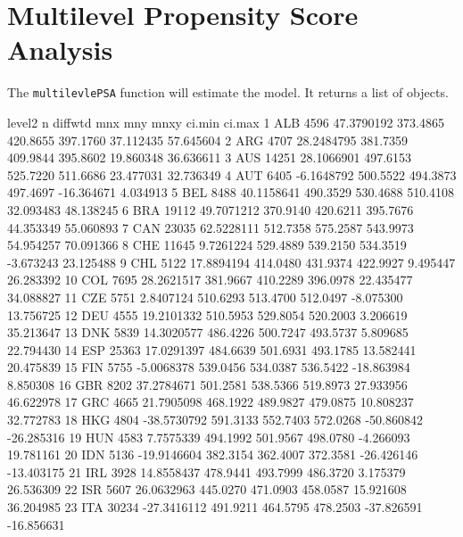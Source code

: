 \documentclass[letterpaper,11pt]{article}
\begin{document}
\section{Multilevel Propensity Score Analysis}

The \texttt{multilevlePSA} function will estimate the model. It returns a list of objects.

\begin{Schunk}
\begin{Soutput}
   level2     n     diffwtd      mnx      mny     mnxy     ci.min     ci.max
1     ALB  4596  47.3790192 373.4865 420.8655 397.1760  37.112435  57.645604
2     ARG  4707  28.2484795 381.7359 409.9844 395.8602  19.860348  36.636611
3     AUS 14251  28.1066901 497.6153 525.7220 511.6686  23.477031  32.736349
4     AUT  6405  -6.1648792 500.5522 494.3873 497.4697 -16.364671   4.034913
5     BEL  8488  40.1158641 490.3529 530.4688 510.4108  32.093483  48.138245
6     BRA 19112  49.7071212 370.9140 420.6211 395.7676  44.353349  55.060893
7     CAN 23035  62.5228111 512.7358 575.2587 543.9973  54.954257  70.091366
8     CHE 11645   9.7261224 529.4889 539.2150 534.3519  -3.673243  23.125488
9     CHL  5122  17.8894194 414.0480 431.9374 422.9927   9.495447  26.283392
10    COL  7695  28.2621517 381.9667 410.2289 396.0978  22.435477  34.088827
11    CZE  5751   2.8407124 510.6293 513.4700 512.0497  -8.075300  13.756725
12    DEU  4555  19.2101332 510.5953 529.8054 520.2003   3.206619  35.213647
13    DNK  5839  14.3020577 486.4226 500.7247 493.5737   5.809685  22.794430
14    ESP 25363  17.0291397 484.6639 501.6931 493.1785  13.582441  20.475839
15    FIN  5755  -5.0068378 539.0456 534.0387 536.5422 -18.863984   8.850308
16    GBR  8202  37.2784671 501.2581 538.5366 519.8973  27.933956  46.622978
17    GRC  4665  21.7905098 468.1922 489.9827 479.0875  10.808237  32.772783
18    HKG  4804 -38.5730792 591.3133 552.7403 572.0268 -50.860842 -26.285316
19    HUN  4583   7.7575339 494.1992 501.9567 498.0780  -4.266093  19.781161
20    IDN  5136 -19.9146604 382.3154 362.4007 372.3581 -26.426146 -13.403175
21    IRL  3928  14.8558437 478.9441 493.7999 486.3720   3.175379  26.536309
22    ISR  5607  26.0632963 445.0270 471.0903 458.0587  15.921608  36.204985
23    ITA 30234 -27.3416112 491.9211 464.5795 478.2503 -37.826591 -16.856631

\end{Soutput}
\end{Schunk}
\end{document}
